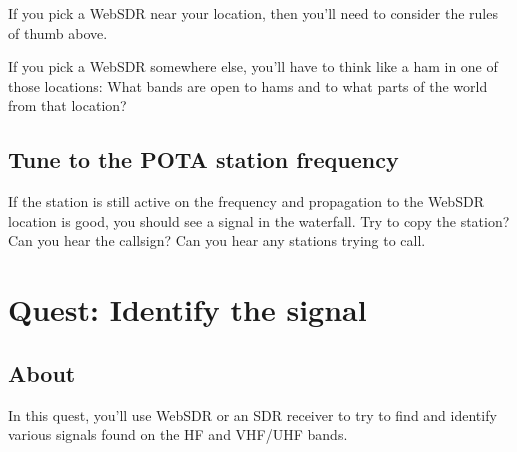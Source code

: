 \documentclass[
  letterpaper,
  DIV=11,
  numbers=noendperiod]{scrreport}
\begin{document}

If you pick a WebSDR near your location, then you'll need to consider
the rules of thumb above.

If you pick a WebSDR somewhere else, you'll have to think like a ham in
one of those locations: What bands are open to hams and to what parts of
the world from that location?

\hypertarget{tune-to-the-pota-station-frequency}{%
\section*{Tune to the POTA station
frequency}\label{tune-to-the-pota-station-frequency}}


If the station is still active on the frequency and propagation to the
WebSDR location is good, you should see a signal in the waterfall. Try
to copy the station? Can you hear the callsign? Can you hear any
stations trying to call.

\hypertarget{quest-identify-the-signal}{%
\chapter*{Quest: Identify the signal}\label{quest-identify-the-signal}}


\hypertarget{about-2}{%
\section*{About}\label{about-2}}


In this quest, you'll use WebSDR or an SDR receiver to try to find and
identify various signals found on the HF and VHF/UHF bands.
\end{document}
